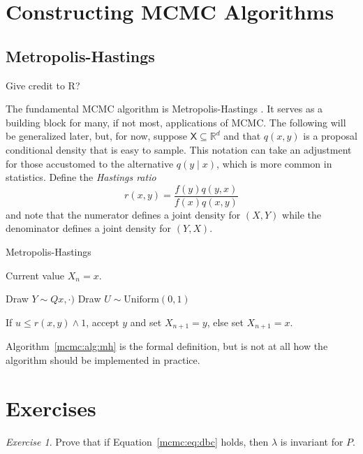 \documentclass[12pt]{article}
\theoremstyle{plain}
\theoremstyle{definition}
\theoremstyle{remark}
\newtheorem{hw}{Exercise}[section]
\newcommand{\X}{\mathsf{X}}
\newcommand{\real}{\mathbb{R}}
\begin{document}
 
 
\section{Constructing MCMC Algorithms}
\label{mcmc:sec:construct}

\subsection{Metropolis-Hastings}
\label{mcmc:sec:mh}

{\color{blue} Give credit to R?}

The fundamental MCMC algorithm is Metropolis-Hastings \cite{hast:1970,
  metr:1953}.  It serves as a building block for many, if not most,
applications of MCMC.  The following will be generalized later, but,
for now, suppose $\X \subseteq \real^d$ and that $q(x,y)$ is a
proposal conditional density that is easy to sample.  This notation can take an
adjustment for those accustomed to the alternative $q(y \mid x)$, which is more
common in statistics.  Define the {\em Hastings ratio}
\[
r(x,y) = \frac{f(y)q(y,x)}{f(x)q(x, y)}
\]
and note that the numerator defines a joint density for $(X,Y)$ while
the denominator defines a joint density for $(Y,X)$.

\begin{algorithm}[H]
 \caption{Metropolis-Hastings} \label{mcmc:alg:mh}
 \begin{algorithmic}[1]
    Current value $X_n = x$.

   \State Draw $Y \sim Qx, \cdot)$ \State Draw
   $U \sim \text{Uniform}(0,1)$
   
   \State If $u \le r(x,y) \wedge 1$, accept $y$ and set $X_{n+1}=y$,
   else set $X_{n+1} = x$.
 \end{algorithmic}
\end{algorithm}

Algorithm~\ref{mcmc:alg:mh} is the formal definition, but is not at
all how the algorithm should be implemented in practice.

\section*{Exercises}
\begin{hw}
  \label{mcmc:hw:dbc}
Prove that if Equation~\ref{mcmc:eq:dbc} holds, then $\lambda$ is
invariant for $P$.
\end{hw}
\end{document}
